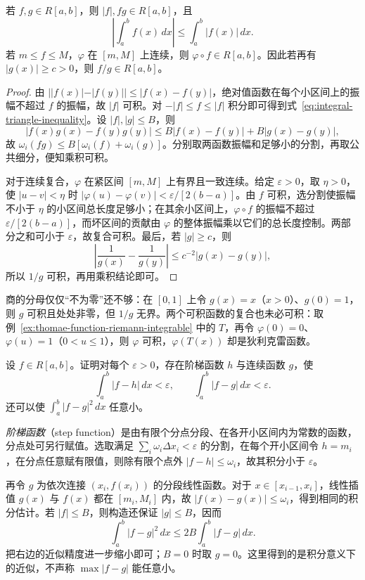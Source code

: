 \begin{theorem}
\label{thm:riemann-integrable-closure}
若 $f,g\in R[a,b]$，则 $|f|,fg\in R[a,b]$，且
\begin{equation}
    \left|\int_a^b f(x)\,dx\right|
    \leq\int_a^b|f(x)|\,dx.
    \label{eq:integral-triangle-inequality}
\end{equation}
若 $m\leq f\leq M$，$\varphi$ 在 $[m,M]$ 上连续，则 $\varphi\circ f\in R[a,b]$。因此若再有 $|g(x)|\geq c>0$，则 $f/g\in R[a,b]$。
\end{theorem}
\begin{proof}
由 $||f(x)|-|f(y)||\leq|f(x)-f(y)|$，绝对值函数在每个小区间上的振幅不超过 $f$ 的振幅，故 $|f|$ 可积。对 $-|f|\leq f\leq|f|$ 积分即可得到式~\eqref{eq:integral-triangle-inequality}。设 $|f|,|g|\leq B$，则
\[
    |f(x)g(x)-f(y)g(y)|
    \leq B|f(x)-f(y)|+B|g(x)-g(y)|,
\]
故 $\omega_i(fg)\leq B[\omega_i(f)+\omega_i(g)]$。分别取两函数振幅和足够小的分割，再取公共细分，便知乘积可积。

对于连续复合，$\varphi$ 在紧区间 $[m,M]$ 上有界且一致连续。给定 $\varepsilon>0$，取 $\eta>0$，使 $|u-v|<\eta$ 时 $|\varphi(u)-\varphi(v)|<\varepsilon/[2(b-a)]$。由 $f$ 可积，选分割使振幅不小于 $\eta$ 的小区间总长度足够小；在其余小区间上，$\varphi\circ f$ 的振幅不超过 $\varepsilon/[2(b-a)]$，而坏区间的贡献由 $\varphi$ 的整体振幅乘以它们的总长度控制。两部分之和可小于 $\varepsilon$，故复合可积。最后，若 $|g|\geq c$，则
\[
    \left|\frac1{g(x)}-\frac1{g(y)}\right|
    \leq c^{-2}|g(x)-g(y)|,
\]
所以 $1/g$ 可积，再用乘积结论即可。
\end{proof}

商的分母仅仅“不为零”还不够：在 $[0,1]$ 上令 $g(x)=x$（$x>0$）、$g(0)=1$，则 $g$ 可积且处处非零，但 $1/g$ 无界。两个可积函数的复合也未必可积：取例~\ref{ex:thomae-function-riemann-integrable} 中的 $T$，再令 $\varphi(0)=0$、$\varphi(u)=1$（$0<u\leq1$），则 $\varphi$ 可积，$\varphi(T(x))$ 却是狄利克雷函数。

\begin{example}
\label{ex:step-and-continuous-integral-approximation}
设 $f\in R[a,b]$。证明对每个 $\varepsilon>0$，存在阶梯函数 $h$ 与连续函数 $g$，使
\[
    \int_a^b|f-h|\,dx<\varepsilon,\qquad
    \int_a^b|f-g|\,dx<\varepsilon.
\]
还可以使 $\int_a^b|f-g|^2\,dx$ 任意小。
\end{example}
\begin{solve}
\emph{阶梯函数}（step function）是由有限个分点分段、在各开小区间内为常数的函数，分点处可另行赋值。选取满足 $\sum_i\omega_i\Delta x_i<\varepsilon$ 的分割，在每个开小区间令 $h=m_i$，在分点任意赋有限值，则除有限个点外 $|f-h|\leq\omega_i$，故其积分小于 $\varepsilon$。

再令 $g$ 为依次连接 $(x_i,f(x_i))$ 的分段线性函数。对于 $x\in[x_{i-1},x_i]$，线性插值 $g(x)$ 与 $f(x)$ 都在 $[m_i,M_i]$ 内，故 $|f(x)-g(x)|\leq\omega_i$，得到相同的积分估计。若 $|f|\leq B$，则构造还保证 $|g|\leq B$，因而
\[
    \int_a^b|f-g|^2\,dx\leq2B\int_a^b|f-g|\,dx.
\]
把右边的近似精度进一步缩小即可；$B=0$ 时取 $g=0$。这里得到的是积分意义下的近似，不声称 $\max|f-g|$ 能任意小。
\end{solve}

